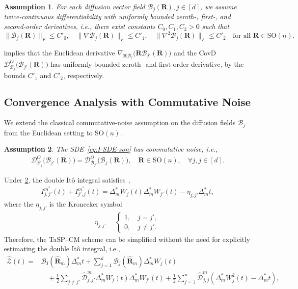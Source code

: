 \documentclass[11pt, a4paper, onecolumn]{article}
\newcommand{\SOn}{\mathrm{SO}(n)}
\newcommand{\m}{m}
\newcommand{\DO}{\tg D^{O}}
\newcommand{\bfR}{\mathbf{R}}
\newcommand{\Z}{\mathcal{Z}}
\newcommand{\B}{\mathcal{B}}
\newcommand{\hatZ}{\widehat{\Z}}
\newcommand{\hatR}{\widehat{\bfR}}
\newcommand{\hatD}{\widehat{\tg D}}
\newcommand{\tg}[1]{\mathcal{#1}}
\newcommand{\ms}{{m^*}}
\newcommand{\Dms}{{\Delta^{*}_{m}}}
\newcommand{\hDjjms}{ {\hatD_{j,j}^{\m}} }
\newcommand{\hDjjpms}{ {\hatD_{j,j'}^{\m}} }
\newcommand{\Ijjpms}{ {I_{j,j'}^{\ms}} }
\newcommand{\Ijpjms}{ {I_{j',j}^{\ms}} }
\newcommand{\half}{{\frac{1}{2}}}
\newcommand{\Der}[4]{
  #1_{#2}\bigl(#3(#4)\bigr)
}
\newcommand{\DerDOjjp}[1]{\Der{\DO}{\B_j}{\B_{j'}}{#1}}
\newcommand{\DerDOjpj}[1]{\Der{\DO}{\B_{j'}}{\B_{j}}{#1}}
\newtheorem{assumption}{Assumption}
\begin{document}
\begin{assumption}\label{asm:diffusion}
For each diffusion vector field $\B_{j}(\mathbf R),j \in[d]$, we assume twice‐continuous differentiability with uniformly bounded zeroth-, first-, and second-order derivatives, i.e., there exist constants $C_0,C_1,C_2>0$ such that
\[
   \|\B_{j}(\mathbf R)\|_F\le C'_0,\quad
   \|\nabla \B_{j}(\mathbf R)\|_F\le C'_1,\quad
   \|\nabla^{2} \B_{j}(\mathbf R)\|_F\le C'_2
   \quad\text{for all }\mathbf R\in\SOn.
\]
\end{assumption}
 implies that the Euclidean derivative $\Der{\nabla}{\bfR\B_j}{\bfR\B_{j'}}{\bfR}$ and the CovD $\DerDOjjp{\bfR}$ has uniformly bounded zeroth- and first-order derivative, by the bounds $C'_1$ and $C'_2$, respectively.


\subsection{Convergence Analysis with Commutative Noise} We extend the classical commutative-noise assumption on the diffusion fields $\B_j$ from the Euclidean setting to $\SOn$.
\begin{assumption}\label{asm:commutative}
    The SDE~\cref{eq:I-SDE-son} has commutative noise, i.e.,
    \begin{align*}
        \DerDOjjp{\bfR} = \DerDOjpj{\bfR}, \quad \bfR\in \SOn, \quad \forall j,j\in [d].
    \end{align*}
\end{assumption}

Under \cref{asm:commutative}, the double It\^o integral satisfies~\cite{higham2021introduction},
\begin{align*}
    \Ijjpms(t) + \Ijpjms(t) = \Dms W_j(t)\Dms W_{j'}(t) - \eta_{j,j'}\Dms t,
\end{align*}
where the $ \eta_{j,j'}$ is the Kronecker symbol
\begin{align*}
    \eta_{j,j'} = \begin{cases}
        1, \quad j=j', \\
        0, \quad j \neq j'.
    \end{cases}
\end{align*}
Therefore, the TaSP–CM scheme can be simplified without the need for explicitly estimating the double It\^o integral, i.e.,
\begin{align*}
    \hatZ(t) = & \B_I(\hatR_{\m})\Dms t + \sum_{j=1}^d \B_j(\hatR_{\m}) \Dms W_{j}(t)  \nonumber \\
               & \quad + \half \sum_{j\neq j'} \hDjjpms  \Dms W_j(t)\Dms W_{j'}(t) + \half \sum_{j=1}^n \hDjjms\left( \Dms W_{j}^2(t) - \Dms t \right),  
\end{align*}
\end{document}
